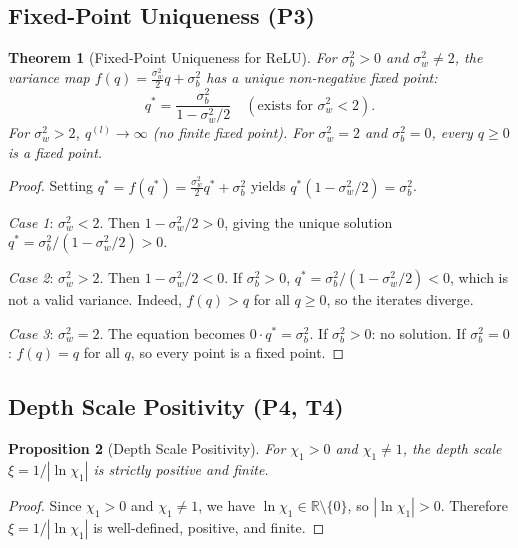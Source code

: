 \documentclass[10pt]{article}
\newcommand{\RR}{\mathbb{R}}
\newtheorem{theorem}{Theorem}
\newtheorem{proposition}[theorem]{Proposition}
\begin{document}
\subsection{Fixed-Point Uniqueness (P3)}

\begin{theorem}[Fixed-Point Uniqueness for ReLU]
\label{thm:fixed-point}
For $\sigma_b^2 > 0$ and $\sigma_w^2 \neq 2$, the variance map $f(q) = \frac{\sigma_w^2}{2}q + \sigma_b^2$ has a unique non-negative fixed point:
\[
q^* = \frac{\sigma_b^2}{1 - \sigma_w^2/2} \quad (\text{exists for } \sigma_w^2 < 2).
\]
For $\sigma_w^2 > 2$, $q^{(l)} \to \infty$ (no finite fixed point).
For $\sigma_w^2 = 2$ and $\sigma_b^2 = 0$, every $q \geq 0$ is a fixed point.
\end{theorem}

\begin{proof}
Setting $q^* = f(q^*) = \frac{\sigma_w^2}{2}q^* + \sigma_b^2$ yields $q^*(1 - \sigma_w^2/2) = \sigma_b^2$.

\emph{Case 1}: $\sigma_w^2 < 2$.
Then $1 - \sigma_w^2/2 > 0$, giving the unique solution $q^* = \sigma_b^2/(1 - \sigma_w^2/2) > 0$.

\emph{Case 2}: $\sigma_w^2 > 2$.
Then $1 - \sigma_w^2/2 < 0$.
If $\sigma_b^2 > 0$, $q^* = \sigma_b^2/(1-\sigma_w^2/2) < 0$, which is not a valid variance.
Indeed, $f(q) > q$ for all $q \geq 0$, so the iterates diverge.

\emph{Case 3}: $\sigma_w^2 = 2$.
The equation becomes $0 \cdot q^* = \sigma_b^2$.
If $\sigma_b^2 > 0$: no solution.
If $\sigma_b^2 = 0$: $f(q) = q$ for all $q$, so every point is a fixed point.
\end{proof}

\subsection{Depth Scale Positivity (P4, T4)}

\begin{proposition}[Depth Scale Positivity]
\label{prop:depth-scale}
For $\chi_1 > 0$ and $\chi_1 \neq 1$, the depth scale $\xi = 1/|\ln \chi_1|$ is strictly positive and finite.
\end{proposition}

\begin{proof}
Since $\chi_1 > 0$ and $\chi_1 \neq 1$, we have $\ln \chi_1 \in \RR \setminus \{0\}$, so $|\ln \chi_1| > 0$.
Therefore $\xi = 1/|\ln \chi_1|$ is well-defined, positive, and finite.
\end{proof}
\end{document}
